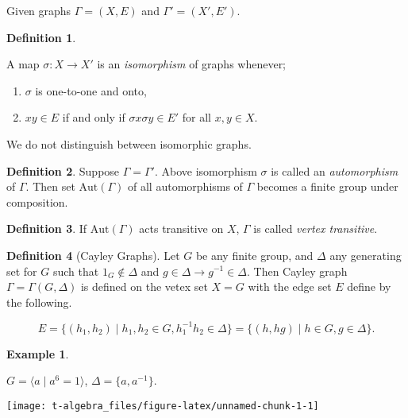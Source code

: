 \documentclass[
]{book}
\providecommand{\tightlist}{%
  \setlength{\itemsep}{0pt}\setlength{\parskip}{0pt}}
\theoremstyle{definition}
\newtheorem{definition}{Definition}[chapter]
\theoremstyle{definition}
\newtheorem{example}{Example}[chapter]
\theoremstyle{definition}
\theoremstyle{definition}
\theoremstyle{remark}
\begin{document}
Given graphs \(\Gamma = (X, E)\) and \(\Gamma' = (X', E')\).

\begin{definition}
\protect\hypertarget{def:isom}{}\label{def:isom}

A map \(\sigma: X \to X'\) is an \emph{isomorphism} of graphs whenever;

\begin{enumerate}
\def\labelenumi{\roman{enumi}.}
\tightlist
\item
  \(\sigma\) is one-to-one and onto,
\item
  \(xy\in E\) if and only if \(\sigma x \sigma y \in E'\) for all \(x, y\in X\).
\end{enumerate}

\end{definition}

We do not distinguish between isomorphic graphs.

\begin{definition}
\protect\hypertarget{def:auto}{}\label{def:auto}Suppose \(\Gamma = \Gamma'\). Above isomorphism \(\sigma\) is called an \emph{automorphism} of \(\Gamma\). Then set \(\mathrm{Aut}(\Gamma)\) of all automorphisms of \(\Gamma\) becomes a finite group under composition.
\end{definition}

\begin{definition}
\protect\hypertarget{def:transitive}{}\label{def:transitive}If \(\mathrm{Aut}(\Gamma)\) acts transitive on \(X\), \(\Gamma\) is called \emph{vertex transitive}.
\end{definition}

\begin{definition}[Cayley Graphs]
\protect\hypertarget{def:cayley}{}\label{def:cayley}Let \(G\) be any finite group, and \(\Delta\) any generating set for \(G\) such that \(1_G \not\in \Delta\) and \(g\in \Delta \to g^{-1}\in \Delta\).
Then Cayley graph \(\Gamma = \Gamma(G, \Delta)\) is defined on the vetex set \(X = G\) with the edge set \(E\) define by the following. 

\[E = \{(h_1,h_2)\mid h_1, h_2\in G, h_1^{-1}h_2\in \Delta\} = \{(h, hg) \mid h\in G, g\in \Delta\}.\]
\end{definition}

\begin{example}
\protect\hypertarget{exm:cyclic6}{}\label{exm:cyclic6}

\(G = \langle a \mid a^6 = 1\rangle\), \(\Delta = \{a, a^{-1}\}\).

\begin{center}\texttt{[image: t-algebra\_files/figure-latex/unnamed-chunk-1-1]} \end{center}

\end{example}
\end{document}
